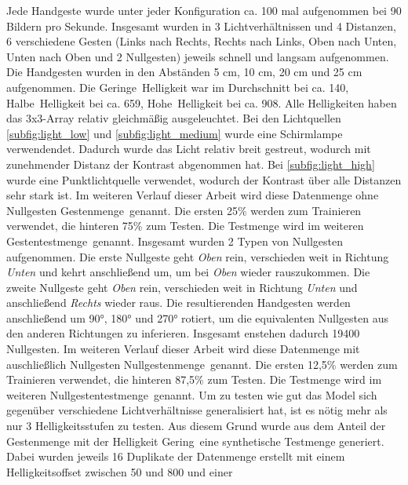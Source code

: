 Jede Handgeste wurde unter jeder Konfiguration ca. 100 mal aufgenommen bei 90 Bildern pro Sekunde. Insgesamt wurden in 3 Lichtverhältnissen und 4 Distanzen, 6 verschiedene Gesten (Links nach Rechts,
Rechts nach Links, Oben nach Unten, Unten nach Oben und 2 Nullgesten) jeweils schnell und langsam aufgenommen. Die Handgesten wurden in den Abständen 5 cm, 10 cm, 20 cm und 25 cm aufgenommen.
\newline
\newline
Die \glqq Geringe\grqq\ Helligkeit war im Durchschnitt bei ca. 140, \glqq Halbe\grqq\ Helligkeit bei ca. 659, \glqq Hohe\grqq\ Helligkeit bei ca. 908. Alle Helligkeiten haben das 3x3-Array
relativ gleichmäßig ausgeleuchtet. Bei den Lichtquellen \ref{subfig:light_low} und \ref{subfig:light_medium} wurde eine Schirmlampe verwendendet. Dadurch wurde das Licht relativ breit gestreut,
wodurch mit zunehmender Distanz der Kontrast abgenommen hat. Bei \ref{subfig:light_high} wurde eine Punktlichtquelle verwendet, wodurch der Kontrast über alle Distanzen sehr stark ist.
Im weiteren Verlauf dieser Arbeit wird diese Datenmenge ohne Nullgesten \glqq Gestenmenge\grqq\ genannt. Die ersten 25\% werden zum Trainieren verwendet, die hinteren 75\% zum Testen. Die Testmenge
wird im weiteren \glqq Gestentestmenge\grqq\ genannt.
\newline
\newline
Insgesamt wurden 2 Typen von Nullgesten aufgenommen. Die erste Nullgeste geht \textit{Oben} rein, verschieden weit in Richtung \textit{Unten} und kehrt anschließend um, um bei \textit{Oben} wieder rauszukommen.
Die zweite Nullgeste geht \textit{Oben} rein, verschieden weit in Richtung \textit{Unten} und anschließend \textit{Rechts} wieder raus. Die resultierenden Handgesten werden anschließend um 90°, 180° und
270° rotiert, um die equivalenten Nullgesten aus den anderen Richtungen zu inferieren. Insgesamt enstehen dadurch 19400 Nullgesten. Im weiteren Verlauf dieser Arbeit wird diese Datenmenge mit auschließlich
Nullgesten \glqq Nullgestenmenge\grqq\ genannt. Die ersten 12,5\% werden zum Trainieren verwendet, die hinteren 87,5\% zum Testen. Die Testmenge wird im weiteren \glqq Nullgestentestmenge\grqq\ genannt.
\newline
\newline
Um zu testen wie gut das Model sich gegenüber verschiedene Lichtverhältnisse generalisiert hat, ist es nötig mehr als nur 3 Helligkeitsstufen zu testen. Aus diesem Grund wurde aus dem Anteil der Gestenmenge mit
der Helligkeit \glqq Gering\grqq\ eine synthetische Testmenge generiert. Dabei wurden jeweils 16 Duplikate der Datenmenge erstellt mit einem Helligkeitsoffset zwischen 50 und 800 und einer
